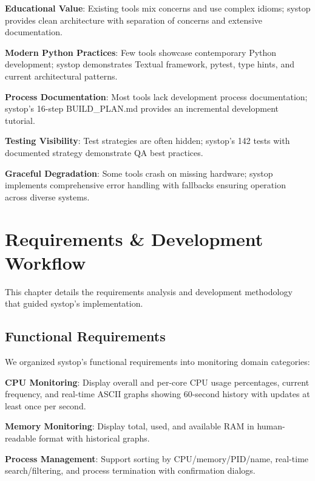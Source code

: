 \documentclass[12pt,a4paper,oneside]{report}
\begin{document}
\textbf{Educational Value}: Existing tools mix concerns and use complex idioms; systop provides clean architecture with separation of concerns and extensive documentation.

\textbf{Modern Python Practices}: Few tools showcase contemporary Python development; systop demonstrates Textual framework, pytest, type hints, and current architectural patterns.

\textbf{Process Documentation}: Most tools lack development process documentation; systop's 16-step BUILD\_PLAN.md provides an incremental development tutorial.

\textbf{Testing Visibility}: Test strategies are often hidden; systop's 142 tests with documented strategy demonstrate QA best practices.

\textbf{Graceful Degradation}: Some tools crash on missing hardware; systop implements comprehensive error handling with fallbacks ensuring operation across diverse systems.

\chapter{Requirements \& Development Workflow}
\label{chap:requirements}

This chapter details the requirements analysis and development methodology that guided systop's implementation.

\section{Functional Requirements}
\label{sec:functional-requirements}

We organized systop's functional requirements into monitoring domain categories:

\textbf{CPU Monitoring}: Display overall and per-core CPU usage percentages, current frequency, and real-time ASCII graphs showing 60-second history with updates at least once per second.

\textbf{Memory Monitoring}: Display total, used, and available RAM in human-readable format with historical graphs.

\textbf{Process Management}: Support sorting by CPU/memory/PID/name, real-time search/filtering, and process termination with confirmation dialogs.
\end{document}
